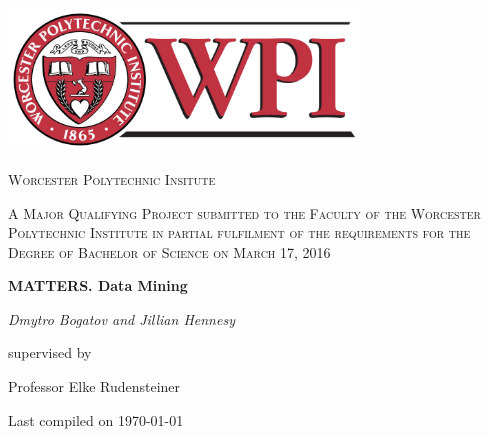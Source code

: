 \begin{titlepage}
	\centering
	
    \includegraphics[width=0.7\textwidth]{images/wpiLogo.png}\par\vspace{1cm}
	
    {\scshape\LARGE Worcester Polytechnic Insitute \par}
	\vspace{1cm}
	
    {\scshape\Large A Major Qualifying Project submitted to the Faculty of the Worcester Polytechnic Institute in partial fulfilment of the requirements for the Degree of Bachelor of Science on March 17, 2016 \par}
	\vspace{0.75cm}
	
    {\huge\bfseries MATTERS. Data Mining \par}
	\vspace{1cm}
	
    {\Large\itshape Dmytro Bogatov and Jillian Hennesy \par}
	\vfill
	
    supervised by\par
	Professor Elke Rudensteiner

	\vfill

	{\large Last compiled on \today\par}
    
\end{titlepage}